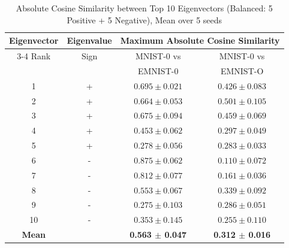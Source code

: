 \begin{table}[htbp]
\centering
\caption{Absolute Cosine Similarity between Top 10 Eigenvectors (Balanced: 5 Positive + 5 Negative), Mean over 5 seeds}
\label{tab:eigenvector_comparison}
\begin{tabular}{cc|cc}
\toprule
Eigenvector & Eigenvalue & \multicolumn{2}{c}{Maximum Absolute Cosine Similarity} \\
\cmidrule(lr){3-4}
Rank & Sign & MNIST-0 vs & MNIST-0 vs \\
 & & EMNIST-0 & EMNIST-O \\
\midrule
1 & + & $0.695 \pm 0.021$ & $0.426 \pm 0.083$ \\
2 & + & $0.664 \pm 0.053$ & $0.501 \pm 0.105$ \\
3 & + & $0.675 \pm 0.094$ & $0.459 \pm 0.069$ \\
4 & + & $0.453 \pm 0.062$ & $0.297 \pm 0.049$ \\
5 & + & $0.278 \pm 0.056$ & $0.283 \pm 0.033$ \\
6 & - & $0.875 \pm 0.062$ & $0.110 \pm 0.072$ \\
7 & - & $0.812 \pm 0.077$ & $0.161 \pm 0.036$ \\
8 & - & $0.553 \pm 0.067$ & $0.339 \pm 0.092$ \\
9 & - & $0.275 \pm 0.103$ & $0.286 \pm 0.051$ \\
10 & - & $0.353 \pm 0.145$ & $0.255 \pm 0.110$ \\
\midrule
\textbf{Mean} & & \textbf{0.563 $\pm$ 0.047} & \textbf{0.312 $\pm$ 0.016} \\
\bottomrule
\end{tabular}
\end{table}